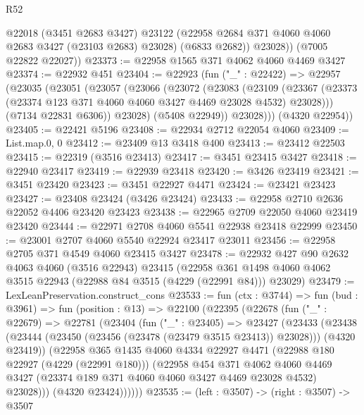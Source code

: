 \begin{lexlean}{R52}
\begin{coremodule}
            @22018
            (@3451 @2683 @3427)
            @23122
            (@22958 @2684 @371 @4060 @4060 @2683 @3427 (@23103 @2683) @23028)
            (@6833 @2682))
          @23028))
      (@7005 @22822 @22027))
@23373 := @22958 @1565 @371 @4062 @4060 @4469 @3427
@23374 := @22932 @451
@23404 := @22923
    (fun ("_" : @22422) =>
    @22957
      (@23035
        (@23051
          (@23057
            (@23066
              (@23072
                (@23083
                  (@23109
                    (@23367
                      (@23373 (@23374 @123 @371 @4060 @4060 @3427 @4469 @23028 @4532) @23028)))
                  (@7134 @22831 @6306))
                @23028)
              (@5408 @22949))
            @23028)))
      (@4320 @22954))
@23405 := @22421 @5196
@23408 := @22934 @2712 @22054 @4060
@23409 := List.map.{0, 0}
@23412 := @23409 @13 @3418 @400
@23413 := @23412 @22503
@23415 := @22319 (@3516 @23413)
@23417 := @3451 @23415 @3427
@23418 := @22940 @23417
@23419 := @22939 @23418
@23420 := @3426 @23419
@23421 := @3451 @23420
@23423 := @3451 @22927 @4471
@23424 := @23421 @23423
@23427 := @23408 @23424 (@3426 @23424)
@23433 := @22958 @2710 @2636 @22052 @4406 @23420 @23423
@23438 := @22965 @2709 @22050 @4060 @23419 @23420
@23444 := @22971 @2708 @4060 @5541 @22938 @23418 @22999
@23450 := @23001 @2707 @4060 @5540 @22924 @23417 @23011
@23456 := @22958 @2705 @371 @4549 @4060 @23415 @3427
@23478 := @22932
    @427
    @90
    @2632
    @4063
    @4060
    (@3516 @22943)
    @23415
    (@22958 @361 @1498 @4060 @4062 @3515 @22943 (@22988 @84 @3515 (@4229 (@22991 @84))) @23029)
@23479 := LexLeanPreservation.construct_cons
@23533 := fun (ctx : @3744) =>
  fun (bud : @3961) =>
  fun (position : @13) =>
  @22100
    (@22395
      (@22678
        (fun ("_" : @22679) =>
        @22781
          (@23404
            (fun ("_" : @23405) =>
            @23427
              (@23433
                (@23438
                  (@23444 (@23450 (@23456 (@23478 (@23479 @3515 @23413)) @23028)))
                  (@4320 @23419))
                (@22958
                  @365
                  @1435
                  @4060
                  @4334
                  @22927
                  @4471
                  (@22988 @180 @22927 (@4229 (@22991 @180)))
                  (@22958
                    @454
                    @371
                    @4062
                    @4060
                    @4469
                    @3427
                    (@23374 @189 @371 @4060 @4060 @3427 @4469 @23028 @4532)
                    @23028)))
              (@4320 @23424))))))
@23535 := (left : @3507) -> (right : @3507) -> @3507

\end{coremodule}
\end{lexlean}
